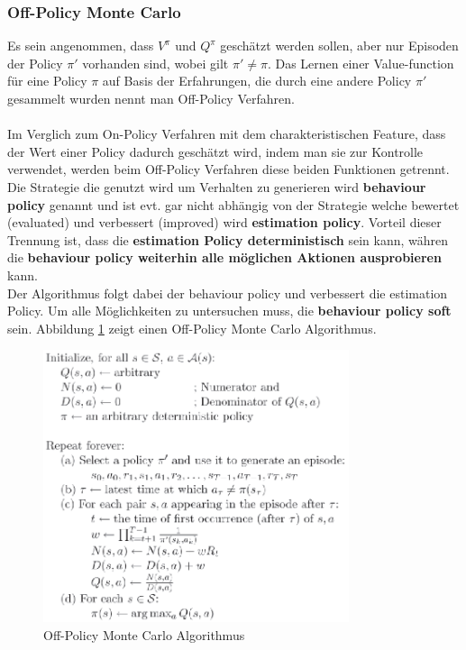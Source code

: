 \documentclass[10pt]{scrartcl}
\begin{document}
\subsubsection{Off-Policy Monte Carlo}
Es sein angenommen, dass $V^{\pi}$ und $Q^{\pi}$ geschätzt werden sollen, aber nur Episoden der Policy $\pi'$ vorhanden sind, wobei gilt $\pi' \neq \pi$. Das Lernen einer Value-function für eine Policy $\pi$ auf Basis der Erfahrungen, die durch eine andere Policy $\pi'$ gesammelt wurden nennt man Off-Policy Verfahren.\\
\\
Im Verglich zum On-Policy Verfahren mit dem charakteristischen Feature, dass der Wert einer Policy dadurch geschätzt wird, indem man sie zur Kontrolle verwendet, werden beim Off-Policy Verfahren diese beiden Funktionen getrennt.\\
Die Strategie die genutzt wird um Verhalten zu generieren wird \textbf{behaviour policy} genannt und ist evt. gar nicht abhängig von der Strategie welche bewertet (evaluated) und verbessert (improved) wird  \textbf{estimation policy}. Vorteil dieser Trennung ist, dass die \textbf{estimation Policy deterministisch} sein kann, währen die\textbf{ behaviour policy weiterhin alle möglichen Aktionen ausprobieren} kann.\\
Der Algorithmus folgt dabei der behaviour policy und verbessert die estimation Policy. Um alle Möglichkeiten zu untersuchen muss, die \textbf{behaviour policy soft} sein. Abbildung \ref{fig:MC_OffPolicy} zeigt einen Off-Policy Monte Carlo Algorithmus.

\begin{figure}[htbp]
	\centering	\includegraphics[width=0.8\textwidth]{Bilder/MC_OffPolicy.png}
	\caption{Off-Policy Monte Carlo Algorithmus}
	\label{fig:MC_OffPolicy}
\end{figure}
\end{document}
